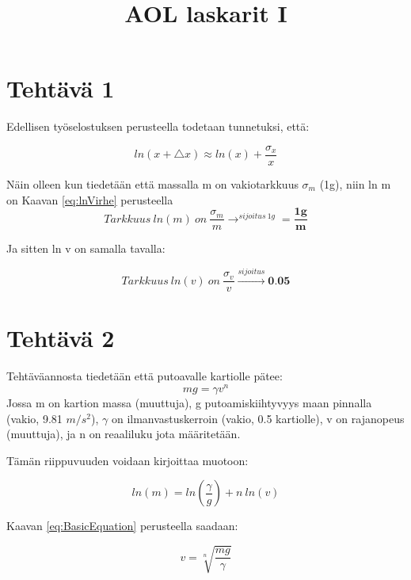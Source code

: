 \documentclass[a4paper, 12pt]{article}
\title{AOL laskarit I}
\begin{document}
\renewcommand{\headrulewidth}{0pt}
\setlength{\headheight}{30pt}
\pagestyle{fancy}

\section*{Tehtävä 1}

Edellisen työselostuksen perusteella todetaan tunnetuksi, että:

\begin{equation}
ln (x+\triangle x) \approx ln(x) + \frac{\sigma_x}{x}
\label{eq:lnVirhe}
\end{equation}

Näin olleen kun tiedetään että massalla m on vakiotarkkuus $\sigma_m $ (1g), niin ln m on Kaavan \ref{eq:lnVirhe} perusteella 
\begin{equation}
Tarkkuus\ ln(m)\ on\ \frac{\sigma_m}{m} \longrightarrow^{sijoitus\ 1g} = \frac{\textbf{1g}}{\textbf{m}}
\end{equation}

Ja sitten ln v on samalla tavalla:

\begin{equation}
Tarkkuus\ ln(v)\ on\ \frac{\sigma_v}{v} 
\stackrel{sijoitus}{\longrightarrow} \textbf{0.05}
\end{equation}


\section*{Tehtävä 2}
Tehtäväannosta tiedetään että putoavalle kartiolle pätee:
\begin{equation}
mg=\gamma v^n
\label{eq:BasicEquation}
\end{equation}
Jossa m on kartion massa (muuttuja), g putoamiskiihtyvyys maan pinnalla (vakio, 9.81 $m/s^2$), $\gamma$ on ilmanvastuskerroin (vakio, 0.5 kartiolle), v on rajanopeus (muuttuja), ja n on reaaliluku jota määritetään.

Tämän riippuvuuden voidaan kirjoittaa muotoon:

\begin{equation}
ln(m)= ln \left( \frac{\gamma}{g} \right)+ n\ ln(v)
\label{eq:LogEquation}
\end{equation}
 
Kaavan \ref{eq:BasicEquation} perusteella saadaan:

\begin{equation}
v=\sqrt[n]{\frac{mg}{\gamma}}
\label{eq:vEquation}
\end{equation}
\end{document}
